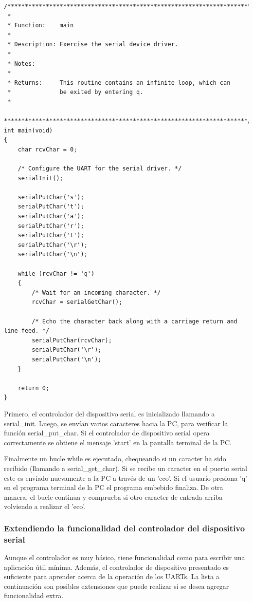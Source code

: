 \documentclass[12pt]{article}
\begin{document}
\begin{verbatim}
/**********************************************************************
 *
 * Function:    main
 *
 * Description: Exercise the serial device driver.
 * 
 * Notes:       
 *
 * Returns:     This routine contains an infinite loop, which can
 *              be exited by entering q.
 *
 **********************************************************************/
int main(void)
{
    char rcvChar = 0;

    /* Configure the UART for the serial driver. */
    serialInit();

    serialPutChar('s');
    serialPutChar('t');
    serialPutChar('a');
    serialPutChar('r');
    serialPutChar('t');
    serialPutChar('\r');
    serialPutChar('\n');

    while (rcvChar != 'q')
    {
        /* Wait for an incoming character. */
        rcvChar = serialGetChar();

        /* Echo the character back along with a carriage return and line feed. */
        serialPutChar(rcvChar);
        serialPutChar('\r');
        serialPutChar('\n');
    }

    return 0;
}
\end{verbatim}

Primero, el controlador del dispositivo serial es inicializado llamando 
a serial\_init. Luego, se envían varios caracteres hacia la PC, para 
verificar la función serial\_put\_char. Si el controlador de dispositivo serial
opera correctamente se obtiene el mensaje 'start' en la pantalla terminal
de la PC.

Finalmente un bucle while es ejecutado, chequeando si un caracter
ha sido recibido (llamando a serial\_get\_char). Si se recibe un caracter
en el puerto serial este es enviado nuevamente a la PC a través de un 'eco'.
Si el usuario presiona 'q' en el programa terminal de la PC el programa
embebido finaliza. De otra manera, el bucle continua y comprueba si otro
caracter de entrada arriba volviendo a realizar el 'eco'.


\subsubsection *{Extendiendo la funcionalidad del controlador del dispositivo serial}


Aunque el controlador es muy básico, tiene funcionalidad como para
escribir una aplicación útil mínima.
Además, el controlador de dispositivo 
presentado es suficiente para aprender acerca de la operación de los UARTs.
La lista a continuación son posibles extensiones que puede realizar
si se desea agregar funcionalidad extra.
\end{document}
